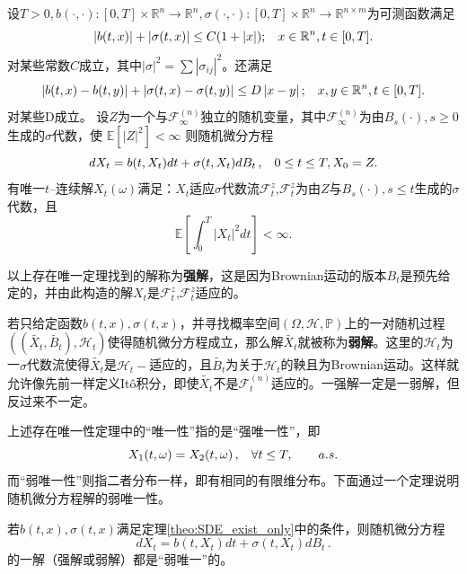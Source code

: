 \documentclass[oneside]{sysuthesis}
\begin{document}
\begin{theorem}[随机微分方程的存在唯一性定理]\label{theo:SDE_exist_only}
	设$T>0,b(\cdot,\cdot):[0,T]\times\mathbb{R}^n\to\mathbb{R}^n,\sigma(\cdot,\cdot):[0,T]\times\mathbb{R}^n\to\mathbb{R}^{n\times m}$为可测函数满足
	\[
	\left\vert b(t,x)\right\vert+\left\vert \sigma(t,x)\right\vert\le C(1+\left\vert x\right\vert);\hspace{0.3cm}x\in\mathbb{R}^n,t\in[0,T].
	\]
	对某些常数$C$成立，其中$\left\vert\sigma\right\vert^2=\sum\left\vert\sigma_{ij}\right\vert^2$。还满足
	\[
	\left\vert b(t,x)-b(t,y)\right\vert+\left\vert \sigma(t,x)-\sigma(t,y)\right\vert\le D\left\vert x-y\right\vert;\hspace{0.3cm}x,y\in\mathbb{R}^n,t\in[0,T].
	\]
	对某些D成立。
	设$Z$为一个与$\mathcal{F}_{\infty}^{(n)}$独立的随机变量，其中$\mathcal{F}_{\infty}^{(n)}$为由$B_s(\cdot),s\ge 0$生成的$\sigma$代数，使
	$
	\mathbb{E}[\left\vert Z\right\vert^2]<\infty
	$
	则随机微分方程
	\[
	dX_t=b(t,X_t)dt+\sigma(t,X_t)dB_t\,,\hspace{0.3cm}0\le t\le T,X_0=Z.
	\]
	有唯一$t$--连续解$X_t(\omega)$满足：$X_t$适应$\sigma$代数流$\mathcal{F}_t^z$,$\mathcal{F}_t^z$为由$Z$与$B_s(\cdot),s\le t$生成的$\sigma$代数，且
	\[
	\mathbb{E}\left[\int_{0}^{T}\left\vert X_t\right\vert^2dt\right]<\infty.
	\]
\end{theorem}

以上存在唯一定理找到的解称为\textbf{强解}，这是因为Brownian运动的版本$B_t$是预先给定的，并由此构造的解$X_t$是$\mathcal{F}_t^z$,$\mathcal{F}_t^z$适应的。

若只给定函数$b(t,x),\sigma(t,x)$，并寻找概率空间$(\Omega,\mathcal{H},\mathbb{P})$上的一对随机过程\\
$((\widetilde{X_t},\widetilde{B_t}),\mathcal{H}_t)$使得随机微分方程成立，那么解$\widetilde{X_t}$就被称为\textbf{弱解}。这里的$\mathcal{H}_t$为一$\sigma$代数流使得$\widetilde{X_t}$是$\mathcal{H}_t-$适应的，且$\widetilde{B_t}$为关于$\mathcal{H}_t$的鞅且为Brownian运动。这样就允许像先前一样定义It\^o积分，即使$\widetilde{X_t}$不是$\mathcal{F}_t^{(n)}$适应的。一强解一定是一弱解，但反过来不一定。

上述存在唯一性定理中的“唯一性”指的是“强唯一性”，即
\[
X_1(t,\omega)=X_2(t,\omega)\,,\hspace{0.3cm}\forall t\le T, \qquad a.s.
\]
而“弱唯一性”则指二者分布一样，即有相同的有限维分布。下面通过一个定理说明随机微分方程解的弱唯一性。

\begin{theorem}[随机微分方程解的弱唯一性]\label{theo:SDE_weak_only}
	若$b(t,x),\sigma(t,x)$满足定理\ref{theo:SDE_exist_only}中的条件，则随机微分方程
	\[
	dX_t=b(t,X_t)dt+\sigma(t,X_t)dB_t\,.
	\]
	的一解（强解或弱解）都是“弱唯一”的。
\end{theorem}
\end{document}
